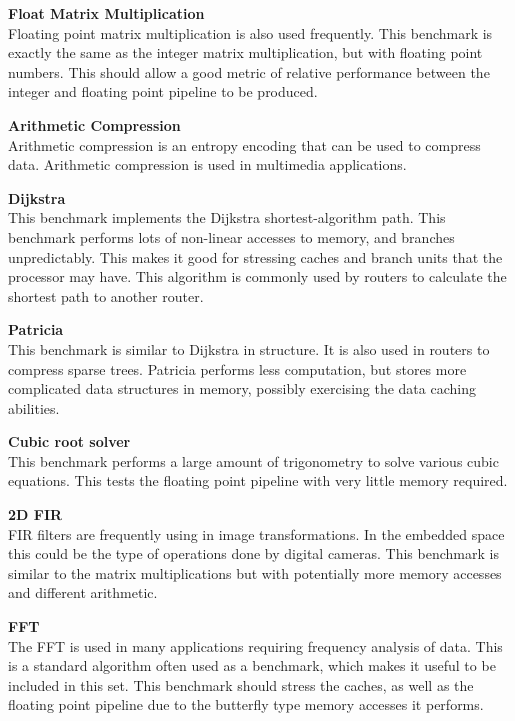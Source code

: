 \documentclass[twocolumn]{article}
\begin{document}
\vspace{3mm}
\textbf{Float Matrix Multiplication}\\
Floating point matrix multiplication is also used frequently. This benchmark is exactly the same as the integer matrix multiplication, but with floating point numbers. This should allow a good metric of relative performance between the integer and floating point pipeline to be produced.

\vspace{3mm}
\textbf{Arithmetic Compression}\\
Arithmetic compression is an entropy encoding that can be used to compress data. Arithmetic compression is used in multimedia applications.

\vspace{3mm}
\textbf{Dijkstra}\\
This benchmark implements the Dijkstra shortest-algorithm path. This benchmark performs lots of non-linear accesses to memory, and branches unpredictably. This makes it good for stressing caches and branch units that the processor may have. This algorithm is commonly used by routers to calculate the shortest path to another router.

\vspace{3mm}
\textbf{Patricia}\\
This benchmark is similar to Dijkstra in structure. It is also used in routers to compress sparse trees. Patricia performs less computation, but stores more complicated data structures in memory, possibly exercising the data caching abilities.

\vspace{3mm}
\textbf{Cubic root solver}\\
This benchmark performs a large amount of trigonometry to solve various cubic equations. This tests the floating point pipeline with very little memory required.

\vspace{3mm}
\textbf{2D FIR}\\
FIR filters are frequently using in image transformations. In the embedded space this could be the type of operations done by digital cameras. This benchmark is similar to the matrix multiplications but with potentially more memory accesses and different arithmetic.

\vspace{3mm}
\textbf{FFT}\\
The FFT is used in many applications requiring frequency analysis of data. This is a standard algorithm often used as a benchmark, which makes it useful to be included in this set. This benchmark should stress the caches, as well as the floating point pipeline due to the butterfly type memory accesses it performs.
\end{document}

